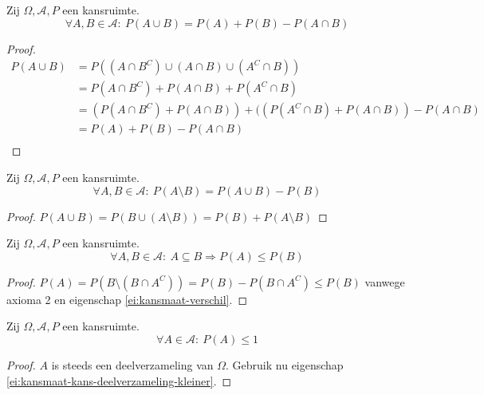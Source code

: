 \documentclass[main.tex]{subfiles}
\begin{document}
\begin{ei}
  Zij $\Omega,\mathcal{A},P$ een kansruimte.
  \[ \forall A,B \in \mathcal{A}:\ P(A \cup B) = P(A) + P(B) - P(A \cap B) \]

  \begin{proof}
    \[
    \begin{array}{rll}
      P(A \cup B) &= P((A \cap B^{C}) \cup (A \cap B) \cup (A^{C}\cap B)) \\
                  &= P(A \cap B^{C})+P(A \cap B) +P(A^{C}\cap B)\\
                  &= (P(A \cap B^{C})+P(A \cap B)) +((P(A^{C}\cap B)+P(A \cap B)) -P(A\cap B) \\
                  &= P(A)+P(B) -P(A\cap B)\\
    \end{array}
    \]
  \end{proof}
\end{ei}


\begin{ei}
  \label{ei:kansmaat-verschil}
  Zij $\Omega,\mathcal{A},P$ een kansruimte.
  \[ \forall A,B \in \mathcal{A}:\ P(A \setminus B) = P(A\cup B) - P(B) \]

  \begin{proof}
    $P(A \cup B) = P(B \cup (A\setminus B)) = P(B) + P(A \setminus B)$
  \end{proof}
\end{ei}

\begin{ei}
  \label{ei:kansmaat-kans-deelverzameling-kleiner}
  Zij $\Omega,\mathcal{A},P$ een kansruimte.
  \[ \forall A,B \in \mathcal{A}:\ A \subseteq B \Rightarrow P(A) \le P(B) \]

  \begin{proof}
    $P(A) = P(B \setminus (B \cap A^{C})) = P(B) - P(B \cap A^{C}) \le P(B)$ vanwege axioma 2 en eigenschap \ref{ei:kansmaat-verschil}.
  \end{proof}
\end{ei}

\begin{ei}
  Zij $\Omega,\mathcal{A},P$ een kansruimte.
  \[ \forall A \in \mathcal{A}:\ P(A) \le 1 \]

  \begin{proof}
    $A$ is steeds een deelverzameling van $\Omega$.
    Gebruik nu eigenschap \ref{ei:kansmaat-kans-deelverzameling-kleiner}.
  \end{proof}
\end{ei}
\end{document}
